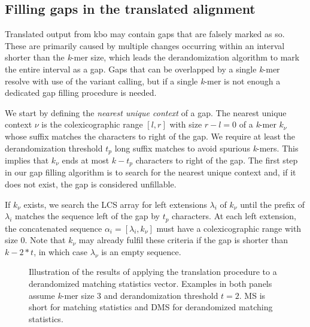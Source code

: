 \documentclass[unnumsec,webpdf,contemporary,large]{oup-authoring-template}%
\theoremstyle{thmstyleone}%
\theoremstyle{thmstyletwo}%
\theoremstyle{thmstylethree}%
\begin{document}
\subsection{Filling gaps in the translated alignment}
Translated output from {\sf kbo} may contain gaps that are falsely marked as so. These are primarily caused by multiple changes occurring within an interval shorter than the \emph{k}-mer size, which leads the derandomization algorithm to mark the entire interval as a gap. Gaps that can be overlapped by a single \emph{k}-mer resolve with use of the variant calling, but if a single \emph{k}-mer is not enough a dedicated gap filling procedure is needed.

We start by defining the \textit{nearest unique context} of a gap. The nearest unique context $\nu$ is the colexicographic range $\left[l,r\right]$ with size $r - l = 0$ of a \emph{k}-mer $k_\nu$ whose suffix matches the characters to right of the gap. We require at least the derandomization threshold $t_p$ long suffix matches to avoid spurious \emph{k}-mers. This implies that $k_\nu$ ends at most $k - t_p$ characters to right of the gap. The first step in our gap filling algorithm is to search for the nearest unique context and, if it does not exist, the gap is considered unfillable.

If $k_\nu$ exists, we search the LCS array for left extensions $\lambda_i$ of $k_\nu$ until the prefix of $\lambda_i$ matches the sequence left of the gap by $t_p$ characters. At each left extension, the concatenated sequence $\alpha_i = \left[\lambda_i, k_\nu\right]$ must have a colexicographic range with size $0$. Note that $k_\nu$ may already fulfil these criteria if the gap is shorter than $k - 2*t$, in which case $\lambda_\nu$ is an empty sequence.

\begin{figure}[t]
    \centering
    
    {}
    \caption{Illustration of the results of applying the translation procedure to a derandomized matching statistics vector. Examples in both panels assume \emph{k}-mer size 3 and derandomization threshold $t=2$. MS is short for matching statistics and DMS for derandomized matching statistics.}
    \label{fig:translate_cases}
\end{figure}
\end{document}
